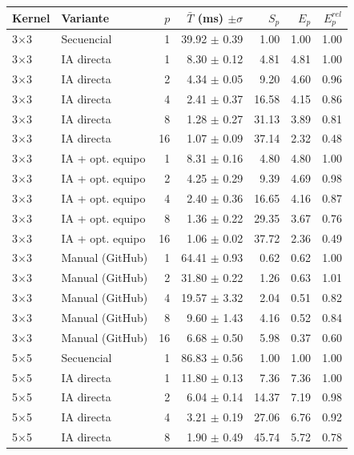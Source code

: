 \begin{tabular}{llrrrrr}
\toprule
Kernel & Variante & $p$ & $\bar{T}$ (ms) $\pm\sigma$ & $S_p$ & $E_p$ & $E^{rel}_p$ \\
\midrule
3$\times$3 & Secuencial & 1 & 39.92 $\pm$ 0.39 & 1.00 & 1.00 & 1.00 \\
3$\times$3 & IA directa & 1 & 8.30 $\pm$ 0.12 & 4.81 & 4.81 & 1.00 \\
3$\times$3 & IA directa & 2 & 4.34 $\pm$ 0.05 & 9.20 & 4.60 & 0.96 \\
3$\times$3 & IA directa & 4 & 2.41 $\pm$ 0.37 & 16.58 & 4.15 & 0.86 \\
3$\times$3 & IA directa & 8 & 1.28 $\pm$ 0.27 & 31.13 & 3.89 & 0.81 \\
3$\times$3 & IA directa & 16 & 1.07 $\pm$ 0.09 & 37.14 & 2.32 & 0.48 \\
3$\times$3 & IA + opt. equipo & 1 & 8.31 $\pm$ 0.16 & 4.80 & 4.80 & 1.00 \\
3$\times$3 & IA + opt. equipo & 2 & 4.25 $\pm$ 0.29 & 9.39 & 4.69 & 0.98 \\
3$\times$3 & IA + opt. equipo & 4 & 2.40 $\pm$ 0.36 & 16.65 & 4.16 & 0.87 \\
3$\times$3 & IA + opt. equipo & 8 & 1.36 $\pm$ 0.22 & 29.35 & 3.67 & 0.76 \\
3$\times$3 & IA + opt. equipo & 16 & 1.06 $\pm$ 0.02 & 37.72 & 2.36 & 0.49 \\
3$\times$3 & Manual (GitHub) & 1 & 64.41 $\pm$ 0.93 & 0.62 & 0.62 & 1.00 \\
3$\times$3 & Manual (GitHub) & 2 & 31.80 $\pm$ 0.22 & 1.26 & 0.63 & 1.01 \\
3$\times$3 & Manual (GitHub) & 4 & 19.57 $\pm$ 3.32 & 2.04 & 0.51 & 0.82 \\
3$\times$3 & Manual (GitHub) & 8 & 9.60 $\pm$ 1.43 & 4.16 & 0.52 & 0.84 \\
3$\times$3 & Manual (GitHub) & 16 & 6.68 $\pm$ 0.50 & 5.98 & 0.37 & 0.60 \\
\midrule
5$\times$5 & Secuencial & 1 & 86.83 $\pm$ 0.56 & 1.00 & 1.00 & 1.00 \\
5$\times$5 & IA directa & 1 & 11.80 $\pm$ 0.13 & 7.36 & 7.36 & 1.00 \\
5$\times$5 & IA directa & 2 & 6.04 $\pm$ 0.14 & 14.37 & 7.19 & 0.98 \\
5$\times$5 & IA directa & 4 & 3.21 $\pm$ 0.19 & 27.06 & 6.76 & 0.92 \\
5$\times$5 & IA directa & 8 & 1.90 $\pm$ 0.49 & 45.74 & 5.72 & 0.78 \\

\end{tabular}
